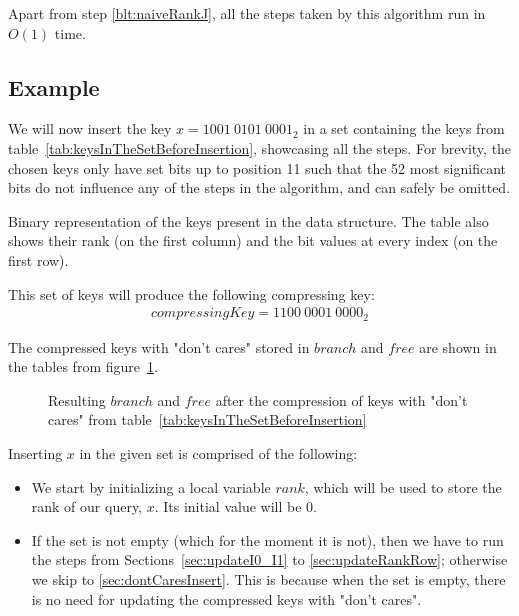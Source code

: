 Apart from step \ref{blt:naiveRankJ}, all the steps taken by this algorithm run in $O(1)$ time.

\subsection{Example} \label{sec:dontCaresInsertExample}

We will now insert the key $x = 1001\ 0101\ 0001_2$ in a set containing the keys from table~\ref{tab:keysInTheSetBeforeInsertion}, showcasing all the steps. For brevity, the chosen keys only have set bits up to position 11 such that the 52 most significant bits do not influence any of the steps in the algorithm, and can safely be omitted.

\begin{table}[H]
\centering

\caption[Example set of keys in binary]{Binary representation of the keys present in the data structure. The table also shows their rank (on the first column) and the bit values at every index (on the first row).}
\label{tab:keysInTheSetBeforeInsertion}
\end{table}

This set of keys will produce the following compressing key:
\begin{align*}
    compressingKey = 1100\ 0001\ 0000_2
\end{align*}

The compressed keys with "don't cares" stored in $branch$ and $free$ are shown in the tables from figure~\ref{fig:branchAndFreeBeforeInsertion}.

\begin{figure}[H]
\centering

\caption{Resulting $branch$ and $free$ after the compression of keys with "don't cares" from table~\ref{tab:keysInTheSetBeforeInsertion}}
\label{fig:branchAndFreeBeforeInsertion}
\end{figure}

Inserting $x$ in the given set is comprised of the following:

\begin{itemize}
    \item
    We start by initializing a local variable $rank$, which will be used to store the rank of our query, $x$. Its initial value will be $0$.
    
    \item
    If the set is not empty (which for the moment it is not), then we have to run the steps from Sections~\ref{sec:updateI0_I1} to \ref{sec:updateRankRow}; otherwise we skip to \ref{sec:dontCaresInsert}. This is because when the set is empty, there is no need for updating the compressed keys with "don't cares".
\end{itemize}


